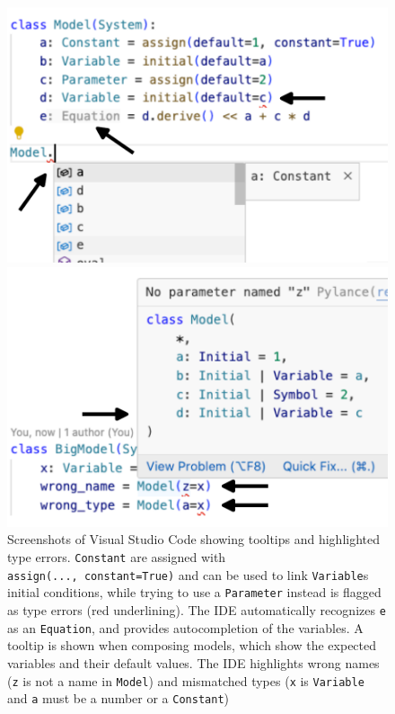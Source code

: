 \begin{figure}[t]

\begin{minipage}[b]{0.50\linewidth}

{\centering 

\includegraphics{src/ide/ide1.pdf}

}

\end{minipage}%
%
\begin{minipage}[b]{0.50\linewidth}

{\centering 

\includegraphics{src/ide/ide2.pdf}

}

\end{minipage}%

\caption{\label{fig-ide}Screenshots of Visual Studio Code showing
tooltips and highlighted type errors. \texttt{Constant} are assigned
with \texttt{assign(...,\ constant=True)} and can be used to link
\texttt{Variable}s initial conditions, while trying to use a
\texttt{Parameter} instead is flagged as type errors (red underlining).
The IDE automatically recognizes \texttt{e} as an \texttt{Equation}, and
provides autocompletion of the variables. A tooltip is shown when
composing models, which show the expected variables and their default
values. The IDE highlights wrong names (\texttt{z} is not a name in
\texttt{Model}) and mismatched types (\texttt{x} is \texttt{Variable}
and \texttt{a} must be a number or a \texttt{Constant})}

\end{figure}
